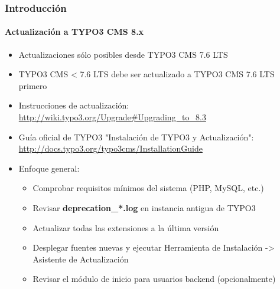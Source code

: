 \begin{frame}[fragile]
	\frametitle{Introducción}
	\framesubtitle{Actualización a TYPO3 CMS 8.x}

	\begin{itemize}
		\item Actualizaciones sólo posibles desde TYPO3 CMS 7.6 LTS
		\item TYPO3 CMS < 7.6 LTS debe ser actualizado a TYPO3 CMS 7.6 LTS primero
	\end{itemize}

	\begin{itemize}

		\item Instrucciones de actualización:\newline
			\smaller\url{http://wiki.typo3.org/Upgrade#Upgrading_to_8.3}\normalsize
		\item Guía oficial de TYPO3 "Instalación de TYPO3 y Actualización":
			\smaller\url{http://docs.typo3.org/typo3cms/InstallationGuide}\normalsize
		\item Enfoque general:
			\begin{itemize}
				\item Comprobar requisitos mínimos del sistema \small(PHP, MySQL, etc.)
				\item Revisar \textbf{deprecation\_*.log} en instancia antigua de TYPO3
				\item Actualizar todas las extensiones a la última versión
                \item Desplegar fuentes nuevas y ejecutar Herramienta de Instalación -> Asistente de Actualización
                \item Revisar el módulo de inicio para usuarios backend (opcionalmente)
			\end{itemize}
	\end{itemize}

\end{frame}


